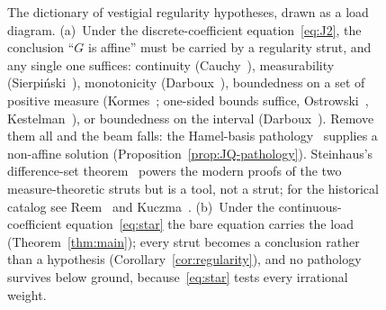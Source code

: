 \documentclass{article}
\theoremstyle{plain}
\theoremstyle{definition}
\begin{document}
\begin{figure}[ht]
{%
}
\caption{The dictionary of vestigial regularity hypotheses, drawn as a
load diagram. (a)~Under the discrete-coefficient
equation~\eqref{eq:J2}, the conclusion ``$G$ is affine'' must be
carried by a regularity strut, and any single one suffices: continuity
(Cauchy~\cite{Cauchy1821}), measurability
(Sierpi\'nski~\cite{Sierpinski1920}), monotonicity
(Darboux~\cite{Darboux1875}), boundedness on a set of positive measure
(Kormes~\cite{Kormes1926}; one-sided bounds suffice,
Ostrowski~\cite{Ostrowski1929}, Kestelman~\cite{Kestelman1947}), or
boundedness on the interval (Darboux~\cite{Darboux1880}). Remove them
all and the beam falls: the Hamel-basis pathology~\cite{Hamel1905}
supplies a non-affine solution (Proposition~\ref{prop:JQ-pathology}).
Steinhaus's difference-set theorem~\cite{Steinhaus1920} powers the
modern proofs of the two measure-theoretic struts but is a tool, not a
strut; for the historical catalog see Reem~\cite{Reem2017} and
Kuczma~\cite[\S13.2]{Kuczma2009}. (b)~Under the continuous-coefficient
equation~\eqref{eq:star} the bare equation carries the load
(Theorem~\ref{thm:main}); every strut becomes a conclusion rather than
a hypothesis (Corollary~\ref{cor:regularity}), and no pathology
survives below ground, because~\eqref{eq:star} tests every irrational
weight.}
\label{fig:dictionary}
\end{figure}
\end{document}
